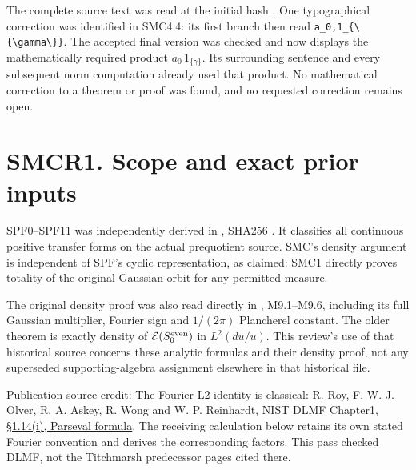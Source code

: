 The complete source text was read at the initial hash
.
One typographical correction was identified in SMC4.4: its first branch
then read
\texttt{a\_0,1\_\{\textbackslash{}\{\textbackslash{}gamma\textbackslash{}\}\}}.
The accepted final version was checked and now displays the
mathematically required product \(a_0\,1_{\{\gamma\}}\). Its surrounding
sentence and every subsequent norm computation already used that
product. No mathematical correction to a theorem or proof was found, and
no requested correction remains open.

\section{SMCR1. Scope and exact prior
inputs}\label{smcr1.-scope-and-exact-prior-inputs}

SPF0--SPF11 was independently derived in
\href{https://github.com/KokunoYumeto/zeta-function-research-reader/blob/main/workbenches/splitzero-tandem/continuations/20260925-full-source-tensor-and-original-divisor/identity/SOURCE_POSITIVE_MEASURES_AND_DESCENT.md}{},
SHA256
.
It classifies all continuous positive transfer forms on the actual
prequotient source. SMC's density argument is independent of SPF's
cyclic representation, as claimed: SMC1 directly proves totality of the
original Gaussian orbit for any permitted measure.

The original density proof was also read directly in
\href{https://github.com/KokunoYumeto/zeta-function-research-reader/blob/main/workbenches/splitzero-tandem/continuations/20260925-full-source-tensor-and-original-divisor/identity/PRIME_MONODROMY_STACKED_HISTORY.md}{},
M9.1--M9.6, including its full Gaussian multiplier, Fourier sign and
\(1/(2\pi)\) Plancherel constant. The older theorem is exactly density
of \(\mathcal E(S_0^{\rm even})\) in \(L^2(du/u)\). This review's use of
that historical source concerns these analytic formulas and their
density proof, not any superseded supporting-algebra assignment
elsewhere in that historical file.

Publication source credit: The Fourier L2 identity is classical: R. Roy,
F. W. J. Olver, R. A. Askey, R. Wong and W. P. Reinhardt, NIST DLMF
Chapter1, \href{https://dlmf.nist.gov/1.14\#i}{§1.14(i), Parseval
formula}. The receiving calculation below retains its own stated Fourier
convention and derives the corresponding factors. This pass checked
DLMF, not the Titchmarsh predecessor pages cited there.

